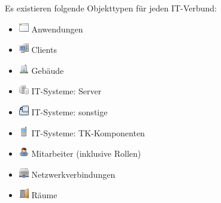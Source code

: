 \documentclass[a4paper,10pt]{book}
\begin{document}
\newline
Es existieren folgende Objekttypen für jeden IT-Verbund:
\begin{itemize}
 \item \includegraphics[height=2ex]{Icon/Anwendung.png} Anwendungen
 \item \includegraphics[height=2ex]{Icon/Clients.png} Clients
 \item \includegraphics[height=2ex]{Icon/Gebaeude.png} Gebäude
 \item \includegraphics[height=2ex]{Icon/Server.png} IT-Systeme: Server
 \item \includegraphics[height=2ex]{Icon/Sonstige.png} IT-Systeme: sonstige
 \item \includegraphics[height=2ex]{Icon/Tk_komponenten.png} IT-Systeme: TK-Komponenten
 \item \includegraphics[height=2ex]{Icon/Mitarbeiter.png} Mitarbeiter (inklusive Rollen)
 \item \includegraphics[height=2ex]{Icon/Netzwerkverbindungen.png} Netzwerkverbindungen
 \item \includegraphics[height=2ex]{Icon/Raeume.png} Räume
\end{itemize}
\end{document}
